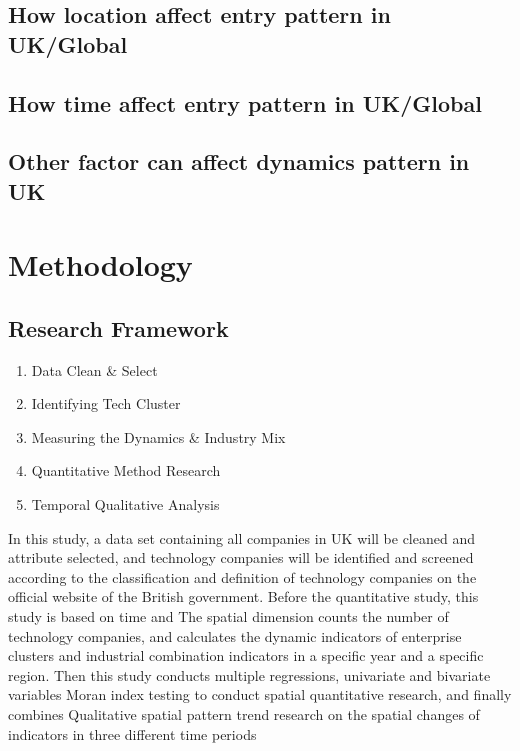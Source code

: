 \documentclass[
  12pt,
  oneside]{book}
\providecommand{\tightlist}{%
  \setlength{\itemsep}{0pt}\setlength{\parskip}{0pt}}
\begin{document}
\hypertarget{how-location-affect-entry-pattern-in-ukglobal}{%
\section{How location affect entry pattern in UK/Global}\label{how-location-affect-entry-pattern-in-ukglobal}}

\hypertarget{how-time-affect-entry-pattern-in-ukglobal}{%
\section{How time affect entry pattern in UK/Global}\label{how-time-affect-entry-pattern-in-ukglobal}}

\hypertarget{other-factor-can-affect-dynamics-pattern-in-uk}{%
\section{Other factor can affect dynamics pattern in UK}\label{other-factor-can-affect-dynamics-pattern-in-uk}}

\hypertarget{methodology}{%
\chapter{Methodology}\label{methodology}}

\hypertarget{research-framework}{%
\section{Research Framework}\label{research-framework}}

\begin{enumerate}
\def\labelenumi{\arabic{enumi}.}
\tightlist
\item
  Data Clean \& Select
\item
  Identifying Tech Cluster
\item
  Measuring the Dynamics \& Industry Mix
\item
  Quantitative Method Research
\item
  Temporal Qualitative Analysis
\end{enumerate}

In this study, a data set containing all companies in UK will be cleaned and attribute selected, and technology companies will be identified and screened according to the classification and definition of technology companies on the official website of the British government. Before the quantitative study, this study is based on time and The spatial dimension counts the number of technology companies, and calculates the dynamic indicators of enterprise clusters and industrial combination indicators in a specific year and a specific region. Then this study conducts multiple regressions, univariate and bivariate variables Moran index testing to conduct spatial quantitative research, and finally combines Qualitative spatial pattern trend research on the spatial changes of indicators in three different time periods
\end{document}

